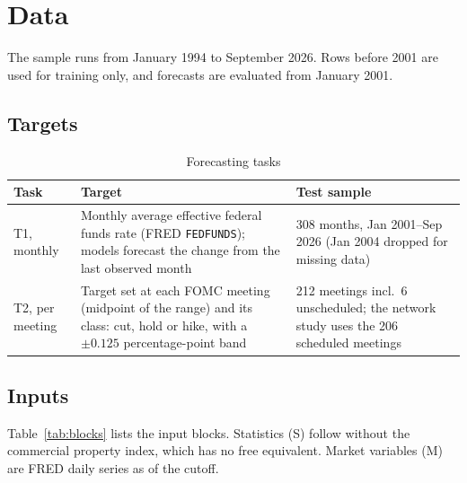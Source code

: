 \documentclass[11pt]{article}
\begin{document}
\section{Data}\label{sec:data}

The sample runs from January 1994 to September 2026. Rows before 2001 are used for training only, and forecasts
are evaluated from January 2001.

\subsection{Targets}

\begin{table}[ht]\centering\small
\caption{Forecasting tasks}\label{tab:tasks}
\begin{tabular}{p{2.6cm}p{6.6cm}p{5.2cm}}
\toprule
Task & Target & Test sample \\ \midrule
T1, monthly & Monthly average effective federal funds rate (FRED \texttt{FEDFUNDS}); models forecast the change
from the last observed month & 308 months, Jan 2001--Sep 2026 (Jan 2004 dropped for missing data) \\
T2, per meeting & Target set at each FOMC meeting (midpoint of the range) and its class: cut, hold or hike, with a
$\pm 0.125$ percentage-point band & 212 meetings incl.\ 6 unscheduled; the network study uses the 206 scheduled
meetings \\
\bottomrule
\end{tabular}
\end{table}

\subsection{Inputs}

Table~\ref{tab:blocks} lists the input blocks. Statistics (S) follow \citet{chanlau2025} without the commercial
property index, which has no free equivalent. Market variables (M) are FRED daily series as of the cutoff.
\end{document}
